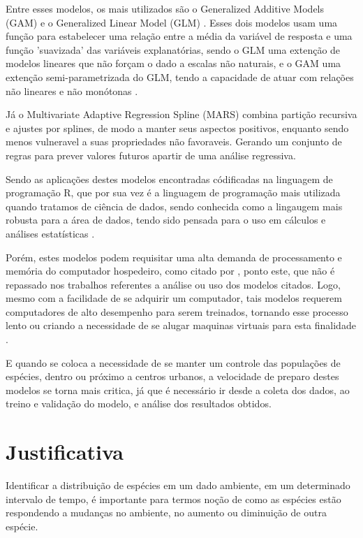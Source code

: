 \documentclass[
	12pt,				%
	openright,			%
	oneside,			%
	a4paper,			%
	english,			%
	brazil				%
	]{abntex2}
\begin{document}
Entre esses modelos, os mais utilizados são o Generalized Additive Models (GAM) \cite{GAM}
e o Generalized Linear Model (GLM) \cite{GLM}. Esses dois modelos usam uma função para 
estabelecer uma relação entre a média da variável de resposta e uma função 'suavizada'
das variáveis explanatórias, sendo o GLM uma extenção de modelos lineares que não
forçam o dado a escalas não naturais, e o GAM uma extenção semi-parametrizada do GLM,
tendo a capacidade de atuar com relações não lineares e não monótonas \cite{GAMeGLM_especie_estudo}. 

Já o Multivariate Adaptive Regression Spline (MARS) combina partição recursiva e ajustes
por splines, de modo a manter seus aspectos positivos, enquanto sendo menos vulneravel a 
suas propriedades não favoraveis. Gerando um conjunto de regras para prever
valores futuros apartir de uma análise regressiva. \cite{MARS} 

Sendo as aplicações destes modelos encontradas códificadas na linguagem de programação R, que por
sua vez é a linguagem de programação mais utilizada quando tratamos de ciência de dados, sendo conhecida
como a lingaugem mais robusta para a área de dados, tendo sido pensada para o uso em cálculos e
análises estatísticas \cite{linguagem_r}.

Porém, estes modelos podem requisitar uma alta demanda de processamento e memória do computador hospedeiro, 
como citado por \cite{modelagem_comp}, ponto este, que não é repassado nos trabalhos referentes a análise 
ou uso dos modelos citados. Logo, mesmo com a facilidade de se adquirir um computador, tais modelos
requerem computadores de alto desempenho para serem treinados, tornando esse processo lento ou criando 
a necessidade de se alugar maquinas virtuais para esta finalidade \cite{global_cloud_maketing}. 

E quando se coloca a necessidade de se manter um controle das populações de espécies, dentro ou próximo
a centros urbanos, a velocidade de preparo destes modelos se torna mais critica, já que é necessário ir
desde a coleta dos dados, ao treino e validação do modelo, e análise dos resultados obtidos.
 
\section{Justificativa}

Identificar a distribuição de espécies em um dado ambiente, em um determinado intervalo de tempo, 
é importante para termos noção de como as espécies estão respondendo a mudanças no ambiente, no aumento 
ou diminuição de outra espécie.
\end{document}
